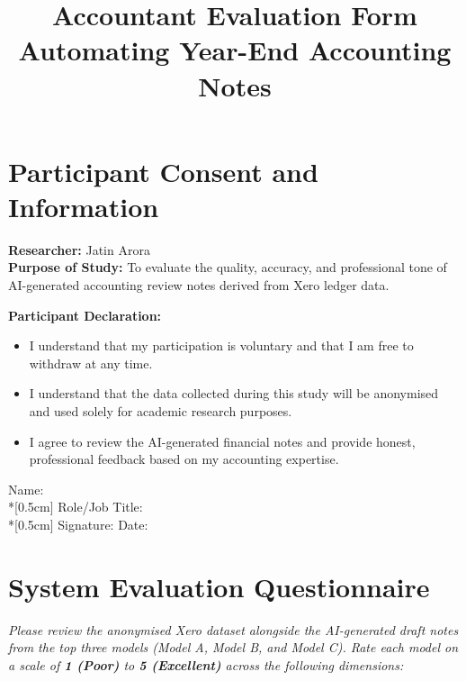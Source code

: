 \documentclass[12pt,a4paper]{article}
\title{\vspace{-2cm}\textbf{Accountant Evaluation Form}\\ \large Automating Year-End Accounting Notes}
\author{}
\date{}
\begin{document}
\maketitle
\thispagestyle{empty}

\section*{Participant Consent and Information}
\textbf{Researcher:} Jatin Arora \\
\textbf{Purpose of Study:} To evaluate the quality, accuracy, and professional tone of AI-generated accounting review notes derived from Xero ledger data.

\vspace{0.5cm}
\noindent \textbf{Participant Declaration:}
\begin{itemize}
    \item I understand that my participation is voluntary and that I am free to withdraw at any time.
    \item I understand that the data collected during this study will be anonymised and used solely for academic research purposes.
    \item I agree to review the AI-generated financial notes and provide honest, professional feedback based on my accounting expertise.
\end{itemize}

\vspace{0.5cm}
\noindent
Name: \hrulefill \\*[0.5cm]
Role/Job Title: \hrulefill \\*[0.5cm]
Signature: \hrulefill \hspace{1cm} Date: \hrulefill

\vspace{1cm}
\section*{System Evaluation Questionnaire}
\textit{Please review the anonymised Xero dataset alongside the AI-generated draft notes from the top three models (Model A, Model B, and Model C). Rate each model on a scale of \textbf{1 (Poor)} to \textbf{5 (Excellent)} across the following dimensions:}
\end{document}

